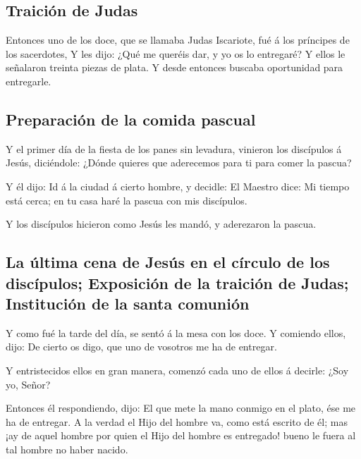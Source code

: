 \hypertarget{traiciuxf3n-de-judas}{%
\subsection{Traición de Judas}\label{traiciuxf3n-de-judas}}

 Entonces uno de los doce, que se llamaba Judas
Iscariote, fué á los príncipes de los sacerdotes,  Y les
dijo: ¿Qué me queréis dar, y yo os lo entregaré? Y ellos le señalaron
treinta piezas de plata.  Y desde entonces buscaba
oportunidad para entregarle.

\hypertarget{preparaciuxf3n-de-la-comida-pascual}{%
\subsection{Preparación de la comida
pascual}\label{preparaciuxf3n-de-la-comida-pascual}}

 Y el primer día de la fiesta de los panes sin levadura,
vinieron los discípulos á Jesús, diciéndole: ¿Dónde quieres que
aderecemos para ti para comer la pascua?

 Y él dijo: Id á la ciudad á cierto hombre, y decidle: El
Maestro dice: Mi tiempo está cerca; en tu casa haré la pascua con mis
discípulos.

 Y los discípulos hicieron como Jesús les mandó, y
aderezaron la pascua.

\hypertarget{la-uxfaltima-cena-de-jesuxfas-en-el-cuxedrculo-de-los-discuxedpulos-exposiciuxf3n-de-la-traiciuxf3n-de-judas-instituciuxf3n-de-la-santa-comuniuxf3n}{%
\subsection{La última cena de Jesús en el círculo de los discípulos;
Exposición de la traición de Judas; Institución de la santa
comunión}\label{la-uxfaltima-cena-de-jesuxfas-en-el-cuxedrculo-de-los-discuxedpulos-exposiciuxf3n-de-la-traiciuxf3n-de-judas-instituciuxf3n-de-la-santa-comuniuxf3n}}

 Y como fué la tarde del día, se sentó á la mesa con los
doce.  Y comiendo ellos, dijo: De cierto os digo, que uno
de vosotros me ha de entregar.

 Y entristecidos ellos en gran manera, comenzó cada uno
de ellos á decirle: ¿Soy yo, Señor?

 Entonces él respondiendo, dijo: El que mete la mano
conmigo en el plato, ése me ha de entregar.  A la verdad
el Hijo del hombre va, como está escrito de él; mas ¡ay de aquel hombre
por quien el Hijo del hombre es entregado! bueno le fuera al tal hombre
no haber nacido.

